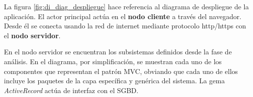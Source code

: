 		La figura \ref{fig:di_diag_despliegue} hace referencia al diagrama de despliegue de la aplicación. El actor principal actúa en el {\bf nodo cliente} a través del navegador. Desde él se conecta usando la red de internet mediante protocolo http/https con el {\bf nodo servidor}. 
		
		En el nodo servidor se encuentran los subsistemas definidos desde la fase de análisis. En el diagrama, por simplificación, se muestran cada uno de los componentes que representan el patrón MVC, obviando que cada uno de ellos incluye los paquetes de la capa específica y genérica del sistema. La gema {\it ActiveRecord} actúa de interfaz con el SGBD.
		
	
